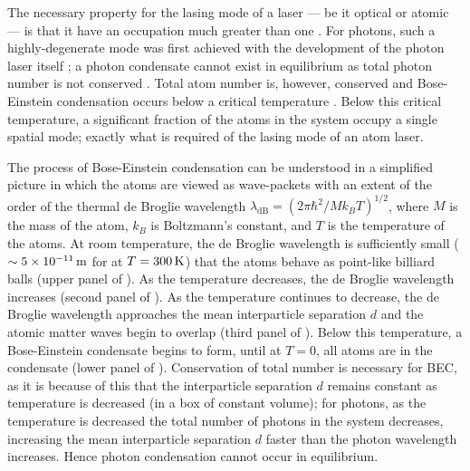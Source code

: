 The necessary property for the lasing mode of a laser --- be it optical or atomic --- is that it have an occupation much greater than one \citep{Wiseman:1997ba}.  For photons, such a highly-degenerate mode was first achieved with the development of the photon laser itself \citep{Maiman:1960,Javan:1961}; a photon condensate cannot exist in equilibrium as total photon number is not conserved \citep{Muller:1986,Ketterle:1999fk}.  Total atom number is, however, conserved and Bose-Einstein condensation occurs below a critical temperature \citep{PethickSmith}.  Below this critical temperature, a significant fraction of the atoms in the system occupy a single spatial mode; exactly what is required of the lasing mode of an atom laser.

The process of Bose-Einstein condensation can be understood in a simplified picture in which the atoms are viewed as wave-packets with an extent of the order of the thermal de Broglie wavelength $\lambda_\text{dB} = (2 \pi \hbar^2 / M k_B T)^{1/2}$, where $M$ is the mass of the atom, $k_B$ is Boltzmann's constant, and $T$ is the temperature of the atoms.  At room temperature, the de Broglie wavelength is sufficiently small ($\sim 5\times\unit[10^{-11}]{m}$ for  at $T=\unit[300]{K}$) that the atoms behave as point-like billiard balls (upper panel of ).  As the temperature decreases, the de Broglie wavelength increases (second panel of ).  As the temperature continues to decrease, the de Broglie wavelength approaches the mean interparticle separation $d$ and the atomic matter waves begin to overlap (third panel of ).  Below this temperature, a Bose-Einstein condensate begins to form, until at $T=0$, all atoms are in the condensate (lower panel of ).  Conservation of total number is necessary for BEC, as it is because of this that the interparticle separation $d$ remains constant as temperature is decreased (in a box of constant volume); for photons, as the temperature is decreased the total number of photons in the system decreases, increasing the mean interparticle separation $d$ faster than the photon wavelength increases.  Hence photon condensation cannot occur in equilibrium.

